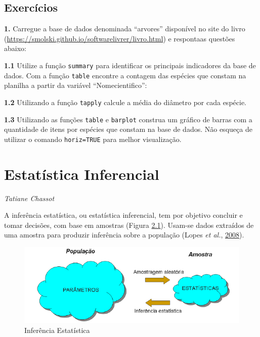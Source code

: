 \documentclass[12pt,brazil,oneside]{book}
\begin{document}
\hypertarget{exercicios-1}{%
\section{Exercícios}\label{exercicios-1}}

\textbf{1.} Carregue a base de dados denominada ``arvores'' disponível no site do livro (\url{https://smolski.github.io/softwarelivrer/livro.html}) e respontaas questões abaixo:

\textbf{1.1} Utilize a função \texttt{summary} para identificar os principais indicadores da base de dados. Com a função \texttt{table} encontre a contagem das espécies que constam na planilha a partir da variável ``Nomecientifico'':

\textbf{1.2} Utilizando a função \texttt{tapply} calcule a média do diâmetro por cada espécie.

\textbf{1.3} Utilizando as funções \texttt{table} e \texttt{barplot} construa um gráfico de barras com a quantidade de itens por espécies que constam na base de dados. Não esqueça de utilizar o comando \texttt{horiz=TRUE} para melhor visualização.

\hypertarget{inf}{%
\chapter{Estatística Inferencial}\label{inf}}

\emph{Tatiane Chassot}

\begin{flushright}
\emph{}
\end{flushright}

A inferência estatística, ou estatística inferencial, tem por objetivo concluir e tomar decisões, com base em amostras (Figura \ref{fig:infestat}). Usam-se dados extraídos de uma amostra para produzir inferência sobre a população (Lopes \emph{et al.}, \protect\hyperlink{ref-lopes2008}{2008}).

\begin{figure}[H]

{\centering \includegraphics[width=0.7\linewidth]{infestat} 

}

\caption{Inferência Estatística}\label{fig:infestat}
\end{figure}
\end{document}

